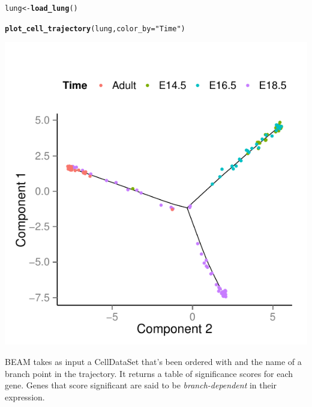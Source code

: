 \documentclass[10pt,oneside]{article}\usepackage[]{graphicx}\usepackage[]{color}
\makeatletter
\def\maxwidth{ %
  \ifdim\Gin@nat@width>\linewidth
    \linewidth
  \else
    \Gin@nat@width
  \fi
}
\newcommand{\hlstr}[1]{\textcolor[rgb]{0.192,0.494,0.8}{#1}}%
\newcommand{\hlstd}[1]{\textcolor[rgb]{0.345,0.345,0.345}{#1}}%
\newcommand{\hlkwb}[1]{\textcolor[rgb]{0.69,0.353,0.396}{#1}}%
\newcommand{\hlkwc}[1]{\textcolor[rgb]{0.333,0.667,0.333}{#1}}%
\newcommand{\hlkwd}[1]{\textcolor[rgb]{0.737,0.353,0.396}{\textbf{#1}}}%
\newenvironment{kframe}{%
 \def\at@end@of@kframe{}%
 \ifinner\ifhmode%
  \def\at@end@of@kframe{\end{minipage}}%
  \begin{minipage}{\columnwidth}%
 \fi\fi%
 \def\FrameCommand##1{\hskip\@totalleftmargin \hskip-\fboxsep
 \colorbox{shadecolor}{##1}\hskip-\fboxsep
     \hskip-\linewidth \hskip-\@totalleftmargin \hskip\columnwidth}%
 \MakeFramed {\advance\hsize-\width
   \@totalleftmargin\z@ \linewidth\hsize
   \@setminipage}}%
 {\par\unskip\endMakeFramed%
 \at@end@of@kframe}
\newenvironment{knitrout}{}{} %
\makeatother
\begin{document}
\begin{knitrout}
\color{fgcolor}\begin{kframe}
\begin{alltt}
\hlstd{lung} \hlkwb{<-} \hlkwd{load_lung}\hlstd{()}
\end{alltt}


{\ttfamily\noindent\itshape\color{messagecolor}{\#\# Removing 4 outliers}}\begin{alltt}
\hlkwd{plot_cell_trajectory}\hlstd{(lung,} \hlkwc{color_by}\hlstd{=}\hlstr{"Time"}\hlstd{)}
\end{alltt}
\end{kframe}

{\centering \includegraphics[width=\maxwidth]{figure/init_treutlein-1} 

}



\end{knitrout}

BEAM takes as input a CellDataSet that's been ordered with  and the name of a branch point in the trajectory. It returns a table of significance scores for each gene. Genes that score significant are said to be \emph{branch-dependent} in their expression.
\end{document}
